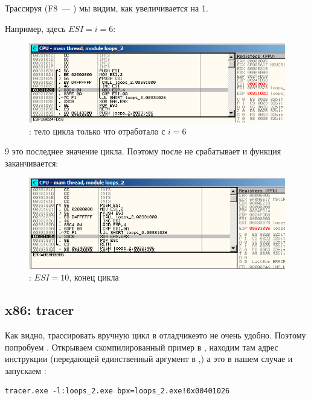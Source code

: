 Трассируя (F8~--- \stepover) мы видим, как \ESI увеличивается на 1.

Например, здесь $ESI=i=6$:

\begin{figure}[H]
\centering
\includegraphics[scale=\FigScale]{patterns/09_loops/simple/olly2.png}
\caption{\olly: тело цикла только что отработало с $i=6$}
\label{fig:loops_olly_2}
\end{figure}

9 это последнее значение цикла.
Поэтому \JL после  не срабатывает и функция заканчивается:


\begin{figure}[H]
\centering
\includegraphics[scale=\FigScale]{patterns/09_loops/simple/olly3.png}
\caption{\olly: $ESI=10$, конец цикла}
\label{fig:loops_olly_3}
\end{figure}

\subsection{x86: tracer}

Как видно, трассировать вручную цикл в отладчике\EMDASH{}это не очень удобно.
Поэтому попробуем \tracer.
Открываем скомпилированный пример в \IDA, находим там адрес инструкции 
(передающей единственный аргумент в \ttf,)
а это  в нашем случае и запускаем \tracer:

\begin{lstlisting}
tracer.exe -l:loops_2.exe bpx=loops_2.exe!0x00401026
\end{lstlisting}

